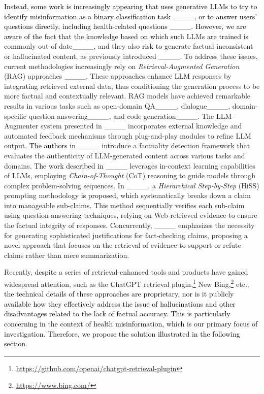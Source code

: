 \textcolor{black}{Instead, some work is increasingly appearing that uses generative LLMs to try to identify misinformation as a binary classification task ____, or to answer users' questions directly, including health-related questions ____.}
\textcolor{black}{However, we are aware of the fact that} the knowledge \textcolor{black}{based on which such} LLMs \textcolor{black}{are trained is} commonly out-of-date____, and they also \textcolor{black}{risk to} generate factual inconsistent or hallucinated content, as previously introduced ____. To address these issues, current methodologies increasingly rely on \textit{Retrieval-Augmented Generation} (RAG) approaches ____. These approaches enhance LLM responses by integrating retrieved external data, thus conditioning the generation process to be more factual and contextually relevant. RAG models have achieved remarkable results in various tasks such as open-domain QA____, dialogue____, domain-specific question answering____, and code generation____. 
%
The LLM-Augmenter system presented in ____ incorporates external knowledge and automated feedback mechanisms through plug-and-play modules to refine LLM output. \textcolor{black}{The authors in} ____ introduce a factuality detection framework that evaluates the authenticity of LLM-generated content across various tasks and domains. \textcolor{black}{The work described in} ____ leverages in-context learning capabilities of LLMs, employing \textit{Chain-of-Thought} (CoT) reasoning to guide models through complex problem-solving sequences. \textcolor{black}{In} ____, a \textit{Hierarchical Step-by-Step} (HiSS) prompting methodology \textcolor{black}{is proposed}, which systematically breaks down a claim into manageable sub-claims. This method sequentially verifies each sub-claim using question-answering techniques, relying on Web-retrieved evidence to ensure the factual integrity of responses. Concurrently, ____ emphasizes the necessity for generating sophisticated justifications for fact-checking claims, proposing a novel approach that focuses on the retrieval of evidence to support or refute claims rather than mere summarization.

Recently, \textcolor{black}{despite} a series of retrieval-enhanced tools and products have gained widespread attention, such as the ChatGPT retrieval plugin,\footnote{\url{https://github.com/openai/chatgpt-retrieval-plugin}} %
New Bing,\footnote{\url{https://www.bing.com/}} etc., \textcolor{black}{the technical details of these approaches are proprietary, nor is it publicly available how they effectively address the issue of hallucinations and other disadvantages related to the lack of factual accuracy. This is particularly concerning in the context of health misinformation, which is our primary focus of investigation. Therefore, we propose the solution illustrated in the following section.}